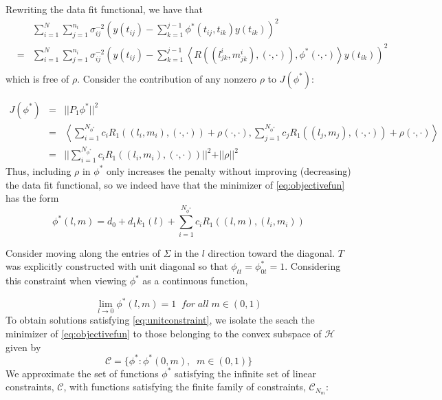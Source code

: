 Rewriting the data fit functional, we have that  
 \begin{eqnarray*}
&\mbox{ }&\sum_{i=1}^N \sum_{j=1}^{n_i} \sigma_{ij}^{-2} \left(y\left(t_{ij}\right) - \sum_{k=1}^{j-1} \phi^*\left(t_{ij}, t_{ik}  \right) y\left(t_{ik}\right)  \right)^2  \\ 
&=& \sum_{i=1}^N \sum_{j=1}^{n_i} \sigma_{ij}^{-2} \left(y\left(t_{ij}\right) - \sum_{k=1}^{j-1} \left< R\left(\left(l^i_{jk},m^i_{jk}\right),\left(\cdot,\cdot\right) \right),\phi^*\left(\cdot,\cdot\right)\right> y\left(t_{ik}\right)  \right)^2  \\
 \end{eqnarray*}
\noindent
which is free of $\rho$. Consider the contribution of any nonzero $\rho$ to $J\left(\phi^*\right)$: 
  
 \begin{eqnarray*}
 J\left(\phi^*\right) &=& \vert \vert  P_1\phi^* \vert \vert^2\\
 &=& \left< \sum_{i=1}^{N_{\phi^*}}  c_i R_1\left( \left(l_i,m_i\right),\left(\cdot,\cdot\right) \right) + \rho\left(\cdot,\cdot \right), \sum_{j=1}^{N_{\phi^*}} c_j R_1\left( \left(l_j,m_j\right),\left(\cdot,\cdot\right) \right) + \rho\left(\cdot,\cdot\right)\right> \\
 &=& \vert \vert \sum_{i=1}^{N_{\phi^*}}  c_i R_1\left(\left(l_i,m_i\right),\left(\cdot,\cdot\right) \right) \vert \vert^2 + \vert \vert  \rho \vert \vert^2 
 \end{eqnarray*}
\noindent
Thus, including $\rho$ in $\phi^*$ only increases the penalty without improving (decreasing) the data fit functional, so we indeed have that the minimizer of \eqref{eq:objectivefun} has the form
\begin{equation}
 \phi^*\left(l,m\right) =  d_0 + d_1k_1\left(l\right) + \sum_{i=1}^{N_{\phi^*}} c_i R_1\left( \left(l,m\right) , \left(l_i,m_i \right)\right)
 \label{eq:finitedimsolution}
 \end{equation}
 
 Consider moving along the entries of $\Sigma$ in the $l$ direction toward the diagonal. $T$ was explicitly constructed with unit diagonal so that $\phi_{tt} = \phi^*_{0t} = 1$. Considering this constraint when viewing $\phi^*$ as a continuous function,
 
 \begin{equation}
\lim_{l\to0} \phi^*\left(l,m\right) = 1\;\;for\; all\; m \in \left(0,1\right)
\label{eq:unitconstraint}
 \end{equation}
 \noindent
To obtain solutions satisfying \eqref{eq:unitconstraint}, we isolate the seach the minimizer of \eqref{eq:objectivefun}  to those belonging to the convex subspace of $\mathcal{H}$ given by
 \[
 \mathcal{C} = \lbrace \phi^*: \phi^*\left(0,m\right),\;\;m \in \left(0,1\right)  \rbrace
 \]
\noindent
We approximate the set of functions $\phi^*$ satisfying the infinite set of linear constraints, $\mathcal{C}$, with functions satisfying the finite family of constraints, $\mathcal{C}_{N_m}$:

